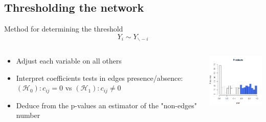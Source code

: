\documentclass[9pt]{beamer}
\begin{document}
\subsection{Thresholding the network}
\begin{frame}{Method for determining the threshold}
    \[Y_i  \sim Y_{\backslash -i}\]
  
   \begin{columns}
    \begin{column}{0.65\linewidth}
     \begin{itemize}
         \item Adjust each variable on all others
         \item Interpret coefficients tests in edges presence/absence: $(\mathcal{H}_0) : c_{ij} = 0$ vs  $(\mathcal{H}_1) : c_{ij} \neq 0$
         \item Deduce from the p-values an estimator of the "non-edges" number
     \end{itemize}
     \end{column}
     \begin{column}{0.35\linewidth}
      \includegraphics[width=4cm]{histpval.PNG}
     \end{column}
    \end{columns}
\end{frame}
\end{document}
